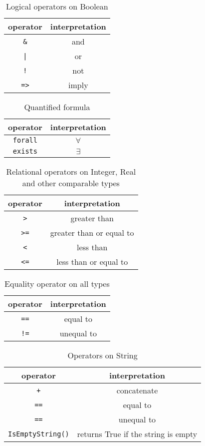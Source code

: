 \documentclass[12pt]{article}
\begin{document}
\begin{table}[h]
\centering
\caption{Logical operators on Boolean}
\begin{tabular}{ c c }
\toprule 
operator & interpretation \\
\midrule
{\tt \&} & and \\ 
{\tt |} & or \\ 
{\tt !} & not \\
{\tt =>} & imply \\
\bottomrule
\end{tabular}
\end{table}

\begin{table}[h]
\centering
\caption{Quantified formula}
\begin{tabular}{ c c }
\toprule 
operator & interpretation \\
\midrule
{\tt forall} & $\forall$ \\ 
{\tt exists} & $\exists$ \\ 
\bottomrule
\end{tabular}
\end{table}

\begin{table}[h]
\centering
\caption{Relational operators on Integer, Real and other comparable types}
\begin{tabular}{ c c }
\toprule 
operator & interpretation \\
\midrule
{\tt >} & greater than \\ 
{\tt >=} & greater than or equal to \\ 
{\tt <} & less than \\
{\tt <=} & less than or equal to \\
\bottomrule
\end{tabular}
\end{table}

\begin{table}[h]
\centering
\caption{Equality operator on all types}
\begin{tabular}{ c c }
\toprule 
operator & interpretation \\
\midrule
{\tt ==} & equal to \\ 
{\tt !=} & unequal to \\ 
\bottomrule
\end{tabular}
\end{table}

\begin{table}[h]
\centering
\caption{Operators on String}
\begin{tabular}{ c c }
\toprule 
operator & interpretation \\
\midrule
{\tt +} & concatenate \\ 
{\tt ==} & equal to \\
{\tt ==} & unequal to \\ 
\verb|IsEmptyString()| & returns True if the string is empty\\
\bottomrule
\end{tabular}
\end{table}
\end{document}
